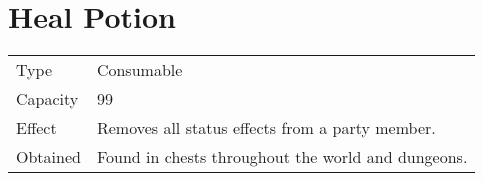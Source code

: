 \section{Heal Potion}
\label{item:heal_potion}


\noindent\begin{tabularx}{\textwidth}[l]{lX}
	Type
	& Consumable
\\ %
	Capacity
	& 99
\\ %
	Effect
	& Removes all status effects from a party member.
\\ %
	Obtained
	& Found in chests throughout the world and dungeons.
\end{tabularx}
